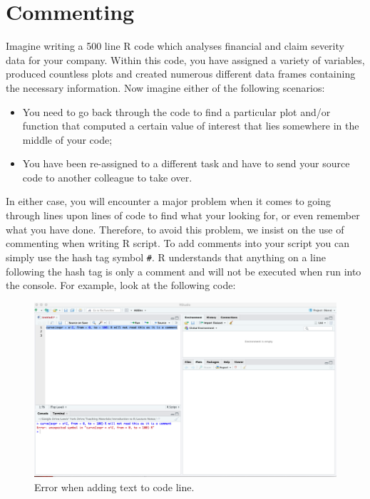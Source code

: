 \documentclass[
]{book}
\providecommand{\tightlist}{%
  \setlength{\itemsep}{0pt}\setlength{\parskip}{0pt}}
\theoremstyle{definition}
\theoremstyle{definition}
\theoremstyle{definition}
\theoremstyle{definition}
\theoremstyle{remark}
\begin{document}
\hypertarget{commenting}{%
\section*{Commenting}\label{commenting}}

Imagine writing a 500 line R code which analyses financial and claim severity data for your company. Within this code, you have assigned a variety of variables, produced countless plots and created numerous different data frames containing the necessary information. Now imagine either of the following scenarios:

\begin{itemize}
\tightlist
\item
  You need to go back through the code to find a particular plot and/or function that computed a certain value of interest that lies somewhere in the middle of your code;
\item
  You have been re-assigned to a different task and have to send your source code to another colleague to take over.
\end{itemize}

In either case, you will encounter a major problem when it comes to going through lines upon lines of code to find what your looking for, or even remember what you have done. Therefore, to avoid this problem, we insist on the use of commenting when writing R script. To add comments into your script you can simply use the hash tag symbol \texttt{\#}. R understands that anything on a line following the hash tag is only a comment and will not be executed when run into the console. For example, look at the following code:

\begin{figure}

{\centering \includegraphics[width=0.7\linewidth]{Figures/commenting2} 

}

\caption{Error when adding text to code line.}\label{fig:comment1}
\end{figure}
\end{document}
